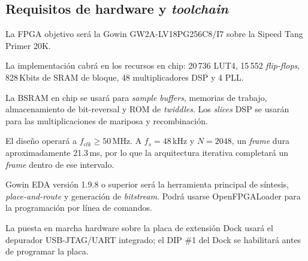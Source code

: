 \documentclass[11pt,a4paper]{article}
\begin{document}
\subsection{Requisitos de hardware y \emph{toolchain}}
\begin{description}[leftmargin=4.2em,style=nextline]
  \item[HW-1:] La FPGA objetivo será la Gowin GW2A-LV18PG256C8/I7 sobre la
    Sipeed Tang Primer 20K.
  \item[HW-2:] La implementación cabrá en los recursos en chip: 20\,736 LUT4,
    15\,552 \emph{flip-flops}, 828\,Kbits de SRAM de bloque, 48 multiplicadores
    DSP y 4 PLL.
  \item[HW-3:] La BSRAM en chip se usará para \emph{sample buffers}, memorias de
    trabajo, almacenamiento de bit-reversal y ROM de \emph{twiddles}. Los
    \emph{slices} DSP se usarán para las multiplicaciones de mariposa y
    recombinación.
  \item[HW-4:] El diseño operará a $f_{clk} \geq 50$\,MHz. A $f_s = 48$\,kHz y
    $N = 2048$, un \emph{frame} dura aproximadamente 21.3\,ms, por lo que la
    arquitectura iterativa completará un \emph{frame} dentro de ese intervalo.
  \item[HW-5:] Gowin EDA versión 1.9.8 o superior será la herramienta principal
    de síntesis, \emph{place-and-route} y generación de \emph{bitstream}. Podrá
    usarse OpenFPGALoader para la programación por línea de comandos.
  \item[HW-6:] La puesta en marcha hardware sobre la placa de extensión Dock
    usará el depurador USB-JTAG/UART integrado; el DIP \#1 del Dock se habilitará
    antes de programar la placa.
\end{description}
\end{document}

